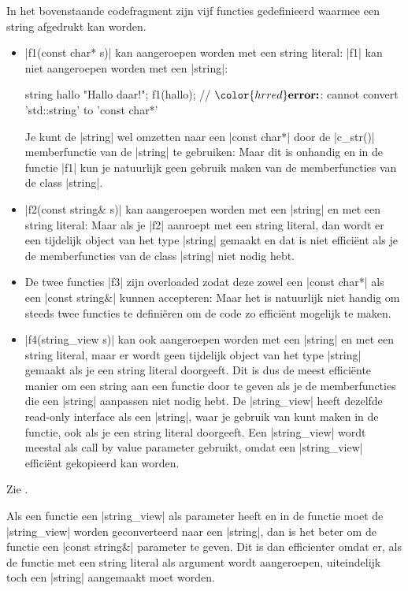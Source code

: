 \begin{cpplstShortInline}
In het bovenstaande codefragment zijn vijf functies gedefinieerd waarmee een string afgedrukt kan worden.
\begin{itemize}
	\item 
	|f1(const char* s)| kan aangeroepen worden met een string literal:
	|f1| kan niet aangeroepen worden met een |string|:
\begin{cpplstfragment}[mathescape=true]
string hallo {"Hallo daar!"};
f1(hallo); // $\color{hrred}\textbf{error:}$: cannot convert 'std::string' to 'const char*'
\end{cpplstfragment}
	Je kunt de |string| wel omzetten naar een |const char*| door de |c_str()| memberfunctie van de |string| te gebruiken:
	Maar dit is onhandig en in de functie |f1| kun je natuurlijk geen gebruik maken van de memberfuncties van de class |string|.
	\item 
	|f2(const string& s)| kan aangeroepen worden met een |string| en met een string literal:
	Maar als je |f2| aanroept met een string literal, dan wordt er een tijdelijk object van het type |string| gemaakt en dat is niet efficiënt als je de memberfuncties van de class |string| niet nodig hebt.
	\item
	De twee functies |f3| zijn overloaded zodat deze zowel een |const char*| als een |const string&| kunnen accepteren:
	Maar het is natuurlijk niet handig om steeds twee functies te definiëren om de code zo efficiënt mogelijk te maken.
	\item |f4(string_view s)| kan ook aangeroepen worden met een |string| en met een string literal, maar er wordt geen tijdelijk object van het type |string| gemaakt als je een string literal doorgeeft.
	Dit is dus de meest efficiënte manier om een string aan een functie door te geven als je de memberfuncties die een |string| aanpassen niet nodig hebt.
	De |string_view| heeft dezelfde read-only interface als een |string|, waar je gebruik van kunt maken in de functie, ook als je een string literal doorgeeft.
	Een |string_view| wordt meestal als call by value parameter gebruikt, omdat een |string_view| efficiënt gekopieerd kan worden.
\end{itemize}
Zie .

Als een functie een |string_view| als parameter heeft en in de functie moet de |string_view| worden geconverteerd naar een |string|, dan is het beter om de functie een |const string&| parameter te geven.
Dit is dan efficienter omdat er, als de functie met een string literal als argument wordt aangeroepen, uiteindelijk toch een |string| aangemaakt moet worden.


\end{cpplstShortInline}
